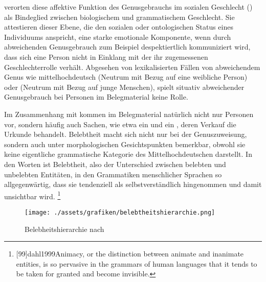 \citet{steriopolosteriopolo2022} verorten diese affektive Funktion des
Genus\-gebrauchs im sozialen Geschlecht () als Bindeglied
zwischen biologischem und grammatischem Geschlecht. Sie attestieren dieser
Ebene, die den sozialen oder ontologischen Status eines Individuums anspricht,
eine starke emotionale Komponente, wenn durch abweichenden Genus\-gebrauch zum
Beispiel despektiertlich kommuniziert wird, dass sich eine Person nicht in
Einklang mit der ihr zugemessenen Geschlechterrolle verhält.
Abgesehen von lexikalisierten Fällen von abweichendem Genus wie
mittelhochdeutsch   (Neutrum mit Bezug auf eine weibliche
Person) oder   (Neutrum mit Bezug auf junge
Menschen), spielt situativ abweichender Genusgebrauch bei Personen im
Belegmaterial keine Rolle.

Im Zusammenhang mit   kommen im Belegmaterial natürlich
nicht nur Personen vor, sondern häufig auch Sachen, wie etwa ein 
 und ein  , deren Verkauf die Urkunde
 \autocites(Freiburg i.\,Br., 1299)[][]{cao4}
behandelt. Belebtheit macht sich nicht nur bei der Genuszuweisung, sondern auch
unter morphologischen Gesichtspunkten bemerkbar, obwohl sie keine eigentliche
grammatische Kategorie des Mittelhochdeutschen darstellt. In den Worten
 ist Belebtheit, also der Unterschied zwischen belebten
und unbelebten Entitäten, in den Grammatiken menschlicher Sprachen so
allgegenwärtig, dass sie tendenziell als selbstverständlich hingenommen und
damit unsichtbar wird.%
%
	\footnote{[99]{dahl1999}{Animacy, or the
		distinction between animate and inanimate entities, is so pervasive in
		the grammars of human languages that it tends to be taken for granted
		and become invisible}.}

\begin{figure}
\centering
\texttt{[image: ./assets/grafiken/belebtheitshierarchie.png]}
\caption{Belebheitshierarchie nach \citet[72]{kotthoffnuebling2018}}
\label{fig:animhier}
\end{figure}

